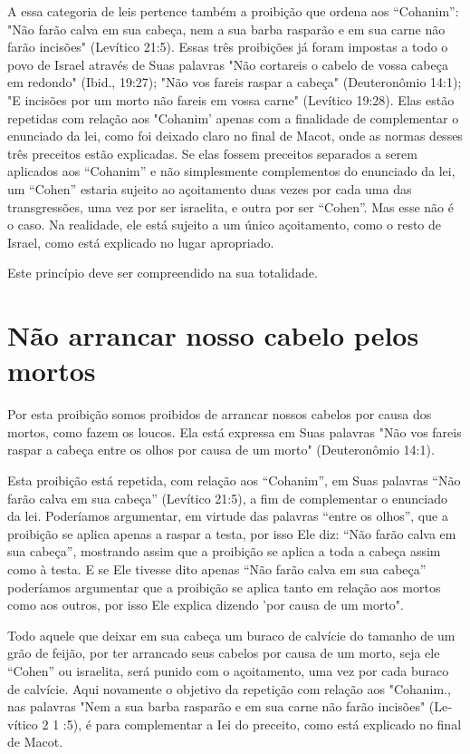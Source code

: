 A essa categoria de leis pertence também a proibição que ordena aos
``Cohanim'': "Não farão calva em sua cabeça, nem a sua barba rasparão e em
sua carne não farão incisões" (Levítico 21:5). Essas três proibições já
foram im­postas a todo o povo de Israel através de Suas palavras "Não
cortareis o cabelo de vossa cabeça em redondo" (Ibid., 19:27); "Não vos
fareis raspar a cabeça" (Deuteronômio 14:1); "E incisões por um morto
não fareis em vossa carne" (Levítico 19:28). Elas estão repetidas com
relação aos "Cohanim' apenas com a finalidade de complementar o
enunciado da lei, como foi deixado claro no final de Macot, onde as
normas desses três preceitos estão explicadas. Se elas fossem preceitos
separados a serem aplicados aos ``Cohanim'' e não simples­mente
complementos do enunciado da lei, um ``Cohen'' estaria sujeito ao
açoi­tamento duas vezes por cada uma das transgressões, uma vez por ser
israelita, e outra por ser ``Cohen''. Mas esse não é o caso. Na realidade,
ele está sujeito a um único açoitamento, como o resto de Israel, como
está explicado no lugar apropriado.


Este princípio deve ser compreendido na sua totalidade.


\section{Não arrancar nosso cabelo pelos mortos}

Por esta proibição somos proibidos de arrancar nossos cabelos por causa
dos mortos, como fazem os loucos. Ela está expressa em Suas palavras
"Não vos fareis raspar a cabeça entre os olhos por causa de um morto"
(Deute­ronômio 14:1).

Esta proibição está repetida, com relação aos ``Cohanim'', em Suas
palavras ``Não farão calva em sua cabeça'' (Levítico 21:5), a fim de
complemen­tar o enunciado da lei. Poderíamos argumentar, em virtude das
palavras ``entre os olhos'', que a proibição se aplica apenas a raspar a
testa, por isso Ele diz: ``Não farão calva em sua cabeça'', mostrando
assim que a proibição se aplica a toda a cabeça assim como à testa. E se
Ele tivesse dito apenas ``Não farão calva em sua cabeça'' poderíamos
argumentar que a proibição se aplica tanto em re­lação aos mortos como
aos outros, por isso Ele explica dizendo 'por causa de um morto".

Todo aquele que deixar em sua cabeça um buraco de calvície do ta­manho
de um grão de feijão, por ter arrancado seus cabelos por causa de um
morto, seja ele ``Cohen'' ou israelita, será punido com o açoitamento, uma
vez por cada buraco de calvície. Aqui novamente
o objetivo da repetição com relação aos
"Cohanim., nas palavras "Nem a sua barba rasparão e em
sua carne não farão incisões" (Le­vítico 2 1 :5), é para complementar a
Iei do preceito, como está explicado no final de Macot.

